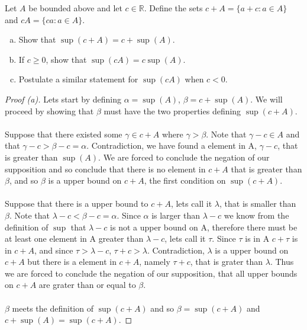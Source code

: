 \documentclass[12pt]{article}
\makeatletter
\theoremstyle{homework}
\newenvironment{exercise}[1]
{\def\@currentlabel{#1}\exercisecore}
{\endexercisecore}
\newcommand{\Reals}{\ensuremath{\mathbb R}}
\makeatother
\begin{document}
\begin{exercise}{1.3.5}  Let $A$ be bounded above and let $c\in\Reals$.
Define the sets $c+A = \{a+c:a\in A\}$ and $cA = \{ca:a\in A\}$.
\begin{enumerate}[(a)]
\item Show that $\sup(c+A) = c + \sup(A)$.
\item If $c\ge 0$, show that $\sup(cA) = c\sup(A)$.
\item Postulate a similar statement for $\sup(cA)$ when $c<0$.
\end{enumerate}
\end{exercise}
\begin{proof}[Proof (a)]
Lets start by defining $\alpha=\sup(A)$, $\beta=c + \sup(A)$.  We will proceed by showing that $\beta$ must have the two properties defining $\sup(c+A)$.\\\\
Suppose that there existed some $\gamma\in c+A$ where $\gamma>\beta$.  Note that $\gamma-c\in A$ and that $\gamma-c>\beta-c=\alpha$.  Contradiction, we have found a element in A, $\gamma-c$, that is greater than $\sup(A)$.  We are forced to conclude the negation of our supposition and so conclude that there is no element in $c+A$ that is greater than $\beta$, and so $\beta$ is a upper bound on $c+A$, the first condition on $\sup(c+A)$.\\\\
Suppose that there is a upper bound to $c+A$, lets call it $\lambda$, that is smaller than $\beta$.  Note that $\lambda-c<\beta-c=\alpha$.  Since $\alpha$ is larger than $\lambda-c$ we know from the definition of $\sup$ that $\lambda-c$ is not a upper bound on A, therefore there must be at least one element in A greater than $\lambda-c$, lets call it $\tau$.  Since $\tau$ is in A $c+\tau$ is in $c+A$, and since $\tau>\lambda-c$, $\tau+c>\lambda$.  Contradiction, $\lambda$ is a upper bound on $c+A$ but there is a element in $c+A$, namely $\tau+c$, that is grater than $\lambda$.  Thus we are forced to conclude the negation of our supposition, that all upper bounds on $c+A$ are grater than or equal to $\beta$.\\\\
$\beta$ meets the definition of $\sup(c+A)$ and so $\beta=\sup(c+A)$ and $c + \sup(A)=\sup(c+A)$.
\end{proof}
\end{document}
